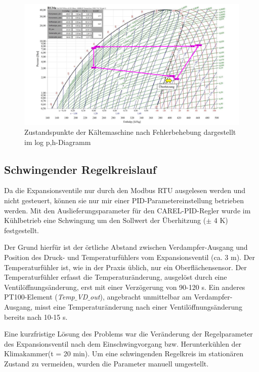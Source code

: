 \begin{figure}[h]
\centering		\includegraphics[page= 1,width=1.05\textwidth]{Pictures/Inbetriebnahme/logphKA.pdf}
\caption{Zustandspunkte der Kältemaschine nach Fehlerbehebung dargestellt im log p,h-Diagramm}
\label{fig:KA_OK}
\end{figure}

\newpage
\subsection*{Schwingender Regelkreislauf}

Da die Expansionsventile nur durch den Modbus RTU ausgelesen werden und nicht gesteuert, können sie nur mir einer PID-Parametereinstellung betrieben werden. Mit den Auslieferungsparameter für den CAREL-PID-Regler wurde im Kühlbetrieb eine Schwingung um den Sollwert der Überhitzung ($\pm$ 4 K) festgestellt. 

Der Grund hierfür ist der örtliche Abstand zwischen Verdampfer-Ausgang und Position des Druck- und Temperaturfühlers vom Expansionsventil (ca. 3 m). Der Temperaturfühler ist, wie in der Praxis üblich, nur ein Oberflächensensor. Der Temperaturfühler erfasst die Temperaturänderung, ausgelöst durch eine Ventilöffnungsänderung,  erst mit einer Verzögerung von 90-120 s. Ein anderes PT100-Element (\textit{Temp$\_$VD$\_$out}), angebracht unmittelbar am Verdampfer-Ausgang,  misst eine Temperaturänderung nach einer Ventilöffnungsänderung bereits nach 10-15 s. 

Eine kurzfristige Lösung des Problems war die Veränderung der Regelparameter des Expansionsventil nach dem Einschwingvorgang bzw. Herunterkühlen der Klimakammer(t = 20 min). Um eine schwingenden Regelkreis im stationären Zustand zu vermeiden, wurden die Parameter manuell umgestellt. 

